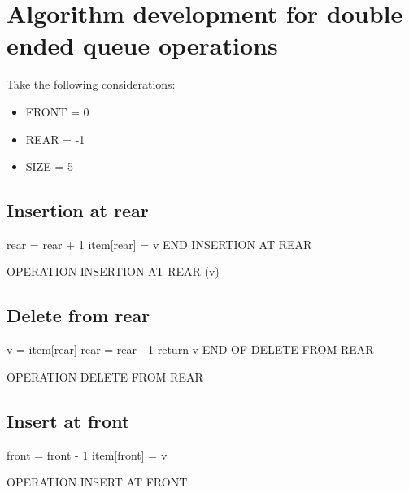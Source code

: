 \section{Algorithm development for double ended queue operations}
Take the following considerations:
\begin{itemize}
    \item FRONT = 0 
    \item REAR = -1
    \item SIZE = 5
\end{itemize}

\subsection{Insertion at rear}
\begin{center}
    \begin{algorithm}[H]
        \SetAlgoLined
        \large

        rear = rear + 1\; 
        item[rear] = v\; 
        END INSERTION AT REAR\; 
        \caption{OPERATION INSERTION AT REAR (v)}
    \end{algorithm}
\end{center}

\subsection{Delete from rear}
\begin{center}
    \begin{algorithm}[H]
        \SetAlgoLined
        \large
        v = item[rear]\; 
        rear = rear - 1\; 
        return v\; 
        END OF DELETE FROM REAR\; 
        \caption{OPERATION DELETE FROM REAR}
    \end{algorithm}
\end{center}

\subsection{Insert at front}
\begin{center}
    \begin{algorithm}[H]
        \SetAlgoLined
        \large
        
        front = front - 1\; 
        item[front] = v\; 
        \caption{OPERATION INSERT AT FRONT}
    \end{algorithm}
\end{center}

